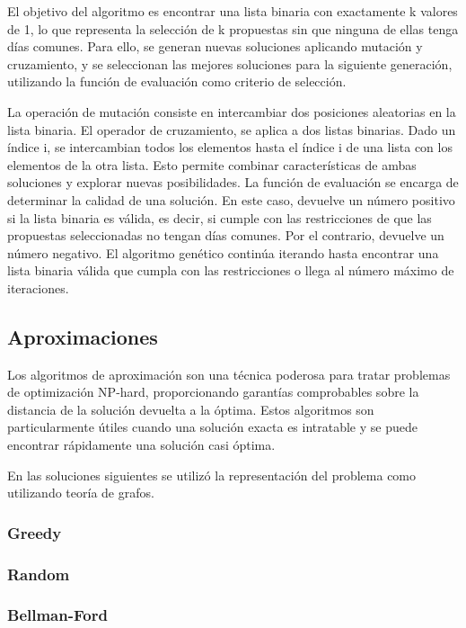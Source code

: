 \documentclass[10pt]{article} %
\begin{document}
	El objetivo del algoritmo es encontrar una lista binaria con exactamente k valores de 1, lo que representa la selección de k propuestas sin que ninguna de ellas tenga días comunes. Para ello, se generan nuevas soluciones aplicando mutación y cruzamiento, y se seleccionan las mejores soluciones para la siguiente generación, utilizando la función de evaluación como criterio de selección. 
	
	La operación de mutación consiste en intercambiar dos posiciones aleatorias en la lista binaria. El operador de cruzamiento, se aplica a dos listas binarias. Dado un índice i, se intercambian todos los elementos hasta el índice i de una lista con los elementos de la otra lista. Esto permite combinar características de ambas soluciones y explorar nuevas posibilidades. La función de evaluación se encarga de determinar la calidad de una solución. En este caso, devuelve un número positivo si la lista binaria es válida, es decir, si cumple con las restricciones de que las propuestas seleccionadas no tengan días comunes. Por el contrario, devuelve un número negativo.  El algoritmo genético continúa iterando hasta encontrar una lista binaria válida que cumpla con las restricciones o llega al n\'umero m\'aximo de iteraciones.
	
	\subsection{Aproximaciones}
	
	Los algoritmos de aproximación son una técnica poderosa para tratar problemas de optimización NP-hard, proporcionando garantías comprobables sobre la distancia de la solución devuelta a la óptima. Estos algoritmos son particularmente útiles cuando una solución exacta es intratable y se puede encontrar rápidamente una solución casi óptima.
	
	En las soluciones siguientes se utiliz\'o la representaci\'on del problema como utilizando teor\'ia de grafos.
	
	\subsubsection{Greedy}
	
	\subsubsection{Random}
	
	\subsubsection{Bellman-Ford} 
	
\end{document}
